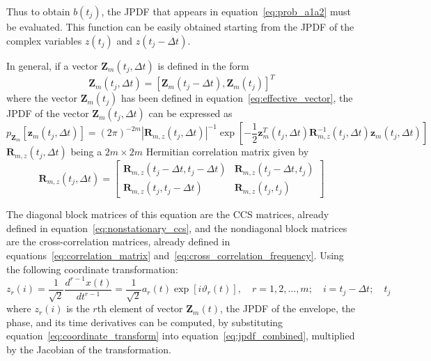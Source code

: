 \documentclass[11pt]{article}
\begin{document}
Thus to obtain $b(t_j)$, the JPDF that appears in equation~\eqref{eq:prob_a1a2} must be evaluated. This function can be easily obtained starting from the JPDF of the complex variables $z(t_j)$ and $z(t_j - \Delta t)$.

In general, if a vector $\mathbf{Z}_m(t_j, \Delta t)$ is defined in the form
\begin{equation}
\mathbf{Z}_m(t_j, \Delta t) = [\mathbf{Z}_m(t_j - \Delta t), \mathbf{Z}_m(t_j)]^T
\label{eq:vector_combined}
\end{equation}
where the vector $\mathbf{Z}_m(t_j)$ has been defined in equation~\eqref{eq:effective_vector}, the JPDF of the vector $\mathbf{Z}_m(t_j, \Delta t)$ can be expressed as
\begin{equation}
p_{\mathbf{Z}_m}[\mathbf{z}_m(t_j, \Delta t)] = (2\pi)^{-2m} |\mathbf{R}_{m,z}(t_j, \Delta t)|^{-1} \exp\left[-\frac{1}{2}\mathbf{z}_m^T(t_j, \Delta t) \mathbf{R}_{m,z}^{-1}(t_j, \Delta t) \mathbf{z}_m(t_j, \Delta t)\right]
\label{eq:jpdf_combined}
\end{equation}
$\mathbf{R}_{m,z}(t_j, \Delta t)$ being a $2m \times 2m$ Hermitian correlation matrix given by
\begin{equation}
\mathbf{R}_{m,z}(t_j, \Delta t) = \begin{bmatrix}
\mathbf{R}_{m,z}(t_j - \Delta t, t_j - \Delta t) & \mathbf{R}_{m,z}(t_j - \Delta t, t_j) \\
\mathbf{R}_{m,z}(t_j, t_j - \Delta t) & \mathbf{R}_{m,z}(t_j, t_j)
\end{bmatrix}
\label{eq:correlation_block}
\end{equation}

The diagonal block matrices of this equation are the CCS matrices, already defined in equation~\eqref{eq:nonstationary_ccs}, and the nondiagonal block matrices are the cross-correlation matrices, already defined in equations~\eqref{eq:correlation_matrix} and~\eqref{eq:cross_correlation_frequency}. Using the following coordinate transformation:
\begin{equation}
z_r(i) = \frac{1}{\sqrt{2}} \frac{d^{r-1} x(t)}{dt^{r-1}} = \frac{1}{\sqrt{2}} a_r(t) \exp[i\vartheta_r(t)], \quad r = 1, 2, \ldots, m; \quad i = t_j - \Delta t; \quad t_j
\label{eq:coordinate_transform}
\end{equation}
where $z_r(i)$ is the $r$th element of vector $\mathbf{Z}_m(t)$, the JPDF of the envelope, the phase, and its time derivatives can be computed, by substituting equation~\eqref{eq:coordinate_transform} into equation~\eqref{eq:jpdf_combined}, multiplied by the Jacobian of the transformation.
\end{document}
